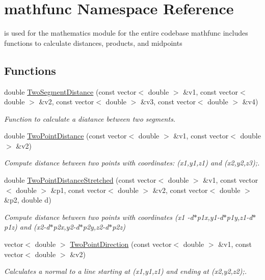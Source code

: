\hypertarget{namespacemathfunc}{\section{mathfunc Namespace Reference}
\label{namespacemathfunc}
}


is used for the mathematics module for the entire codebase mathfunc includes functions to calculate distances, products, and midpoints  


\subsection*{Functions}
\begin{DoxyCompactItemize}
\item 
double \hyperlink{namespacemathfunc_a4f2e296612642f3ac1b4789f85b02c41}{Two\+Segment\+Distance} (const vector$<$ double $>$ \&v1, const vector$<$ double $>$ \&v2, const vector$<$ double $>$ \&v3, const vector$<$ double $>$ \&v4)
\begin{DoxyCompactList}\small\item\em Function to calculate a diatance between two segments. \end{DoxyCompactList}\item 
double \hyperlink{namespacemathfunc_a43b9be958a97530eba2073e9816881eb}{Two\+Point\+Distance} (const vector$<$ double $>$ \&v1, const vector$<$ double $>$ \&v2)
\begin{DoxyCompactList}\small\item\em Compute distance between two points with coordinates\+: (x1,y1,z1) and (x2,y2,z3);. \end{DoxyCompactList}\item 
double \hyperlink{namespacemathfunc_a79cd843c8fc2ad6513a091c86744e9f4}{Two\+Point\+Distance\+Stretched} (const vector$<$ double $>$ \&v1, const vector$<$ double $>$ \&p1, const vector$<$ double $>$ \&v2, const vector$<$ double $>$ \&p2, double d)
\begin{DoxyCompactList}\small\item\em Compute distance between two points with coordinates (x1 -\/d$\ast$p1x,y1-\/d$\ast$p1y,z1-\/d$\ast$p1z) and (x2-\/d$\ast$p2x,y2-\/d$\ast$p2y,z2-\/d$\ast$p2z) \end{DoxyCompactList}\item 
vector$<$ double $>$ \hyperlink{namespacemathfunc_aa45b754771ac16d546864a1a7fb9bf59}{Two\+Point\+Direction} (const vector$<$ double $>$ \&v1, const vector$<$ double $>$ \&v2)
\begin{DoxyCompactList}\small\item\em Calculates a normal to a line starting at (x1,y1,z1) and ending at (x2,y2,z2);. \end{DoxyCompactList}\item 

\end{DoxyCompactItemize}

